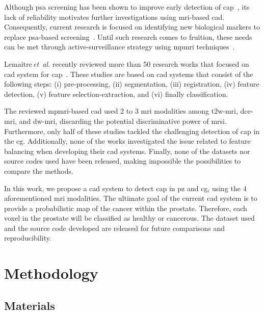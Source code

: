 \documentclass[conference]{sty/ieeeconf}
\begin{document}
Although \ac{psa} screening has been shown to improve early detection
of \ac{cap}~\cite{Chou2011}, its lack of reliability motivates further
investigations using \ac{mri}-based \ac{cad}.
Consequently, current research is focused on identifying new
biological markers to replace \ac{psa}-based
screening~\cite{Brenner2013}.
Until such research comes to fruition, these needs can be met through
active-surveillance strategy using \ac{mpmri}
techniques~\cite{Moore2013}.

Lemaitre\,\emph{et~al.} recently reviewed
more than 50 research works that focused on \ac{cad} system for
\ac{cap}~\cite{Lemaitre2015}.
These studies are based on \ac{cad} systems that consist of the
following steps:
(i) pre-processing,
(ii) segmentation,
(iii) registration,
(iv) feature detection,
(v) feature selection-extraction, and
(vi) finally classification.

The reviewed \ac{mpmri}-based \ac{cad} used 2 to 3
\ac{mri} modalities among \ac{t2w}-\ac{mri}, \ac{dce}-\ac{mri}, and
\ac{dw}-\ac{mri}, discarding the potential discriminative power of
\ac{mrsi}.
Furthermore, only half of these studies tackled the challenging
detection of \ac{cap} in the \ac{cg}.
Additionally, none of the works investigated the issue related to
feature balancing when developing their \ac{cad} systems.
Finally, none of the datasets nor source codes used have been
released, making impossible the possibilities to compare the methods.

In this work, we propose a \ac{cad} system to detect \ac{cap} in
\ac{pz} and \ac{cg}, using the 4 aforementioned \ac{mri}
modalities.
The ultimate goal of the current \ac{cad} system is to provide a probabilistic
map of the cancer within the prostate.
Therefore, each voxel in the prostate will be classified as healthy or
cancerous.
The dataset used and the source code developed are released for future
comparisons and reproducibility.

\section{Methodology}\label{sec:chp6:method}

\subsection{Materials}
\end{document}
